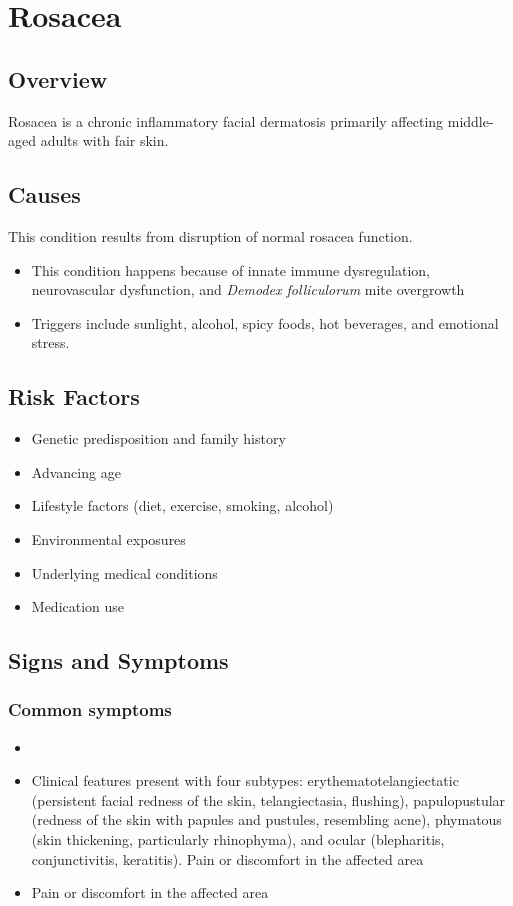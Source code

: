 \chapter{Rosacea}
\label{sec:Rosacea}

\section{Overview}
Rosacea is a chronic inflammatory facial dermatosis primarily affecting middle-aged adults with fair skin.
\section{Causes}
This condition results from disruption of normal rosacea function.

\begin{itemize}[noitemsep]
  \item This condition happens because of innate immune dysregulation, neurovascular dysfunction, and \textit{Demodex folliculorum} mite overgrowth
  \item Triggers include sunlight, alcohol, spicy foods, hot beverages, and emotional stress.
\end{itemize}
\section{Risk Factors}


\begin{itemize}[noitemsep]
  \item Genetic predisposition and family history
  \item Advancing age
  \item Lifestyle factors (diet, exercise, smoking, alcohol)
  \item Environmental exposures
  \item Underlying medical conditions
  \item Medication use
\end{itemize}
\section{Signs and Symptoms}

\subsection{Common symptoms}
\begin{itemize}[noitemsep]
  \item \item Clinical features present with four subtypes: erythematotelangiectatic (persistent facial redness of the skin, telangiectasia, flushing), papulopustular (redness of the skin with papules and pustules, resembling acne), phymatous (skin thickening, particularly rhinophyma), and ocular (blepharitis, conjunctivitis, keratitis). Pain or discomfort in the affected area    \item Pain or discomfort in the affected area
  \end{itemize}

